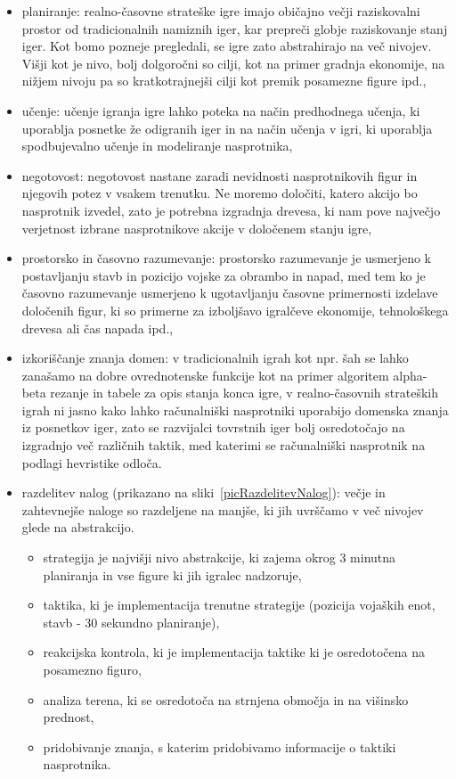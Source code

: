 \documentclass[a4paper, 12pt]{book}
\begin{document}
\begin{itemize}
	\item planiranje: realno-časovne strateške igre imajo običajno večji raziskovalni prostor od tradicionalnih namiznih iger, kar prepreči globje raziskovanje stanj iger. 
	Kot bomo pozneje pregledali, se igre zato abstrahirajo na več nivojev.
	Višji kot je nivo, bolj dolgoročni so cilji, kot na primer gradnja ekonomije, na nižjem nivoju pa so kratkotrajnejši cilji kot premik posamezne figure ipd.,
	\item učenje: učenje igranja igre lahko poteka na način predhodnega učenja, ki uporablja posnetke že odigranih iger in na način učenja v igri, ki uporablja spodbujevalno učenje in modeliranje nasprotnika,
	\item negotovost: negotovost nastane zaradi nevidnosti nasprotnikovih figur in njegovih potez v vsakem trenutku. 
	Ne moremo določiti, katero akcijo bo nasprotnik izvedel, zato je potrebna izgradnja drevesa, ki nam pove največjo verjetnost izbrane nasprotnikove akcije v določenem stanju igre,
	\item prostorsko in časovno razumevanje: prostorsko razumevanje je usmerjeno k postavljanju stavb in pozicijo vojske za obrambo in napad, med tem ko je časovno razumevanje usmerjeno k ugotavljanju časovne primernosti izdelave določenih figur, ki so primerne za izboljšavo igralčeve ekonomije, tehnološkega drevesa ali čas napada ipd.,
	\item izkoriščanje znanja domen: v tradicionalnih igrah kot npr. šah se lahko zanašamo na dobre ovrednotenske funkcije kot na primer algoritem alpha-beta rezanje in tabele za opis stanja konca igre, v realno-časovnih strateških igrah ni jasno kako lahko računalniški nasprotniki uporabijo domenska znanja iz posnetkov iger, zato se razvijalci tovrstnih iger bolj osredotočajo na izgradnjo več različnih taktik, med katerimi se računalniški nasprotnik na podlagi hevristike odloča.
	\item razdelitev nalog (prikazano na sliki~\ref{picRazdelitevNalog}): večje in zahtevnejše naloge so razdeljene na manjše, ki jih uvrščamo v več nivojev glede na abstrakcijo.
	\begin{itemize}
		\item strategija je najvišji nivo abstrakcije, ki zajema okrog 3 minutna planiranja in vse figure ki jih igralec nadzoruje, 
		\item taktika, ki je implementacija trenutne strategije (pozicija vojaških enot, stavb - 30 sekundno planiranje),
		\item reakcijska kontrola, ki je implementacija taktike ki je osredotočena na posamezno figuro,
		\item analiza terena, ki se osredotoča na strnjena območja in na višinsko prednost,
		\item pridobivanje znanja, s katerim pridobivamo informacije o taktiki nasprotnika.
	\end{itemize}


\end{itemize}
\end{document}
